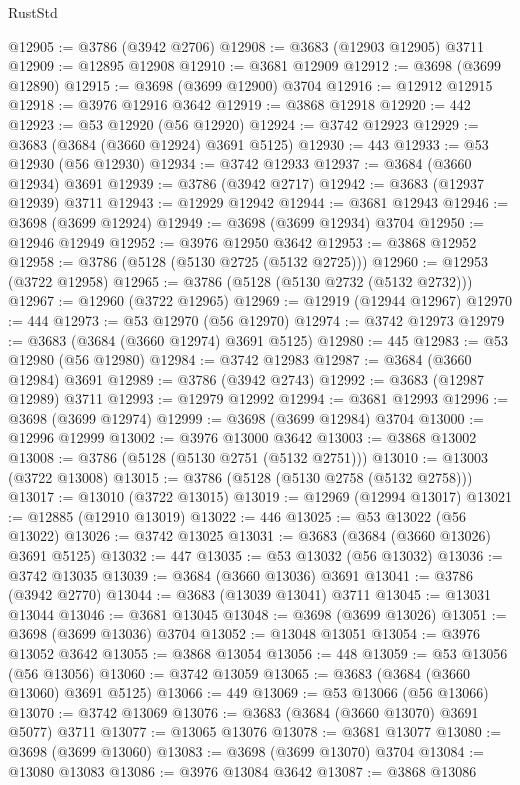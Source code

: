 \begin{lexlean}{RustStd}
\begin{coremodule}
{\begin{coremodule}
{{{{{{{{{{{{{{{{{{{{{{{{{{{{{{{{{{{{{{{{{{{{{{{@12905 := @3786 (@3942 @2706)
@12908 := @3683 (@12903 @12905) @3711
@12909 := @12895 @12908
@12910 := @3681 @12909
@12912 := @3698 (@3699 @12890)
@12915 := @3698 (@3699 @12900) @3704
@12916 := @12912 @12915
@12918 := @3976 @12916 @3642
@12919 := @3868 @12918
@12920 := 442
@12923 := @53 @12920 (@56 @12920)
@12924 := @3742 @12923
@12929 := @3683 (@3684 (@3660 @12924) @3691 @5125)
@12930 := 443
@12933 := @53 @12930 (@56 @12930)
@12934 := @3742 @12933
@12937 := @3684 (@3660 @12934) @3691
@12939 := @3786 (@3942 @2717)
@12942 := @3683 (@12937 @12939) @3711
@12943 := @12929 @12942
@12944 := @3681 @12943
@12946 := @3698 (@3699 @12924)
@12949 := @3698 (@3699 @12934) @3704
@12950 := @12946 @12949
@12952 := @3976 @12950 @3642
@12953 := @3868 @12952
@12958 := @3786 (@5128 (@5130 @2725 (@5132 @2725)))
@12960 := @12953 (@3722 @12958)
@12965 := @3786 (@5128 (@5130 @2732 (@5132 @2732)))
@12967 := @12960 (@3722 @12965)
@12969 := @12919 (@12944 @12967)
@12970 := 444
@12973 := @53 @12970 (@56 @12970)
@12974 := @3742 @12973
@12979 := @3683 (@3684 (@3660 @12974) @3691 @5125)
@12980 := 445
@12983 := @53 @12980 (@56 @12980)
@12984 := @3742 @12983
@12987 := @3684 (@3660 @12984) @3691
@12989 := @3786 (@3942 @2743)
@12992 := @3683 (@12987 @12989) @3711
@12993 := @12979 @12992
@12994 := @3681 @12993
@12996 := @3698 (@3699 @12974)
@12999 := @3698 (@3699 @12984) @3704
@13000 := @12996 @12999
@13002 := @3976 @13000 @3642
@13003 := @3868 @13002
@13008 := @3786 (@5128 (@5130 @2751 (@5132 @2751)))
@13010 := @13003 (@3722 @13008)
@13015 := @3786 (@5128 (@5130 @2758 (@5132 @2758)))
@13017 := @13010 (@3722 @13015)
@13019 := @12969 (@12994 @13017)
@13021 := @12885 (@12910 @13019)
@13022 := 446
@13025 := @53 @13022 (@56 @13022)
@13026 := @3742 @13025
@13031 := @3683 (@3684 (@3660 @13026) @3691 @5125)
@13032 := 447
@13035 := @53 @13032 (@56 @13032)
@13036 := @3742 @13035
@13039 := @3684 (@3660 @13036) @3691
@13041 := @3786 (@3942 @2770)
@13044 := @3683 (@13039 @13041) @3711
@13045 := @13031 @13044
@13046 := @3681 @13045
@13048 := @3698 (@3699 @13026)
@13051 := @3698 (@3699 @13036) @3704
@13052 := @13048 @13051
@13054 := @3976 @13052 @3642
@13055 := @3868 @13054
@13056 := 448
@13059 := @53 @13056 (@56 @13056)
@13060 := @3742 @13059
@13065 := @3683 (@3684 (@3660 @13060) @3691 @5125)
@13066 := 449
@13069 := @53 @13066 (@56 @13066)
@13070 := @3742 @13069
@13076 := @3683 (@3684 (@3660 @13070) @3691 @5077) @3711
@13077 := @13065 @13076
@13078 := @3681 @13077
@13080 := @3698 (@3699 @13060)
@13083 := @3698 (@3699 @13070) @3704
@13084 := @13080 @13083
@13086 := @3976 @13084 @3642
@13087 := @3868 @13086
}}}}}}}}}}}}}}}}}}}}}}}}}}}}}}}}}}}}}}}}}}}}}}}
\end{coremodule}}
\end{coremodule}
\end{lexlean}
